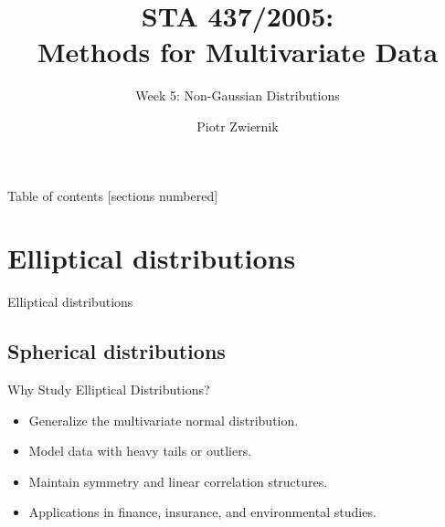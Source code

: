 \documentclass[11pt,handout,aspectratio=169]{beamer}
\title[STA437-Week1]{STA 437/2005: \\ Methods for Multivariate Data}
\subtitle[]{Week 5: Non-Gaussian Distributions}
\author[Piotr Zwiernik]{Piotr Zwiernik}
\institute[UofT]{University of Toronto}
\date{}
\begin{document}
\maketitle

\begin{frame}{Table of contents}
[sections numbered]
\tableofcontents%
\end{frame}

\section{Elliptical distributions}

\begin{frame}{}
	\begin{center}
		{\Huge \alert{Elliptical distributions}}
	\end{center}
\end{frame}

\subsection{Spherical distributions}

\begin{frame}{Why Study Elliptical Distributions?}
    \begin{itemize}
        \item Generalize the multivariate normal distribution.\\[5mm]
        \item Model data with heavy tails or outliers.\\[5mm]
        \item Maintain symmetry and linear correlation structures.\\[5mm]
        \item Applications in finance, insurance, and environmental studies.
    \end{itemize}
\end{frame}
\end{document}
